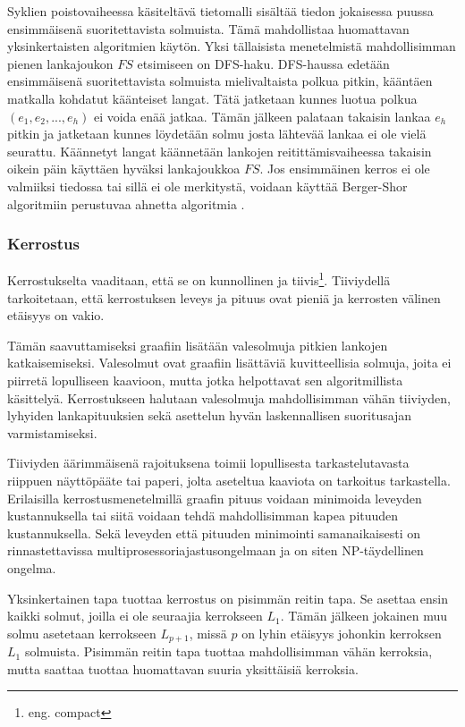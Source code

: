 \documentclass[finnish,12pt]{article}
\begin{document}
Syklien poistovaiheessa käsiteltävä tietomalli sisältää tiedon jokaisessa puussa ensimmäisenä suoritettavista solmuista.
Tämä mahdollistaa huomattavan yksinkertaisten algoritmien käytön.
Yksi tällaisista menetelmistä mahdollisimman pienen lankajoukon $FS$ etsimiseen on DFS-haku.
DFS-haussa edetään ensimmäisenä suoritettavista solmuista mielivaltaista polkua pitkin, kääntäen matkalla kohdatut käänteiset langat. Tätä jatketaan kunnes luotua polkua $(e_1,e_2, ..., e_h)$ ei voida enää jatkaa.
Tämän jälkeen palataan takaisin lankaa $e_h$ pitkin ja jatketaan kunnes löydetään solmu josta lähtevää lankaa ei ole vielä seurattu. \cite{RefWorks:69}
Käännetyt langat käännetään lankojen reitittämisvaiheessa takaisin oikein päin käyttäen hyväksi lankajoukkoa $FS$.
Jos ensimmäinen kerros ei ole valmiiksi tiedossa tai sillä ei ole merkitystä, voidaan käyttää Berger-Shor algoritmiin \cite{RefWorks:68} perustuvaa ahnetta algoritmia \cite{RefWorks:48}.


		\subsubsection{Kerrostus}

Kerrostukselta vaaditaan, että se on kunnollinen ja tiivis\footnote{eng. compact}.
Tiiviydellä tarkoitetaan, että kerrostuksen leveys ja pituus ovat pieniä ja kerrosten välinen etäisyys on vakio. 

Tämän saavuttamiseksi graafiin lisätään valesolmuja pitkien lankojen katkaisemiseksi.
Valesolmut ovat graafiin lisättäviä kuvitteellisia solmuja, joita ei piirretä lopulliseen kaavioon, mutta jotka helpottavat sen algoritmillista käsittelyä.
Kerrostukseen halutaan valesolmuja mahdollisimman vähän tiiviyden, lyhyiden lankapituuksien sekä asettelun hyvän laskennallisen suoritusajan varmistamiseksi.

Tiiviyden äärimmäisenä rajoituksena toimii lopullisesta tarkastelutavasta riippuen näyttöpääte tai paperi, jolta aseteltua kaaviota on tarkoitus tarkastella.
Erilaisilla kerrostusmenetelmillä graafin pituus voidaan minimoida leveyden kustannuksella tai siitä voidaan tehdä mahdollisimman kapea pituuden kustannuksella.
Sekä leveyden että pituuden minimointi samanaikaisesti on rinnastettavissa multiprosessoriajastusongelmaan ja on siten NP-täydellinen ongelma. \cite{RefWorks:39}

Yksinkertainen tapa tuottaa kerrostus on pisimmän reitin tapa.
Se asettaa ensin kaikki solmut, joilla ei ole seuraajia kerrokseen $L_1$.
Tämän jälkeen jokainen muu solmu asetetaan kerrokseen $L_{p+1}$, missä $p$ on lyhin etäisyys johonkin kerroksen $L_1$ solmuista.
Pisimmän reitin tapa tuottaa mahdollisimman vähän kerroksia, mutta saattaa tuottaa huomattavan suuria yksittäisiä kerroksia.
\end{document}
